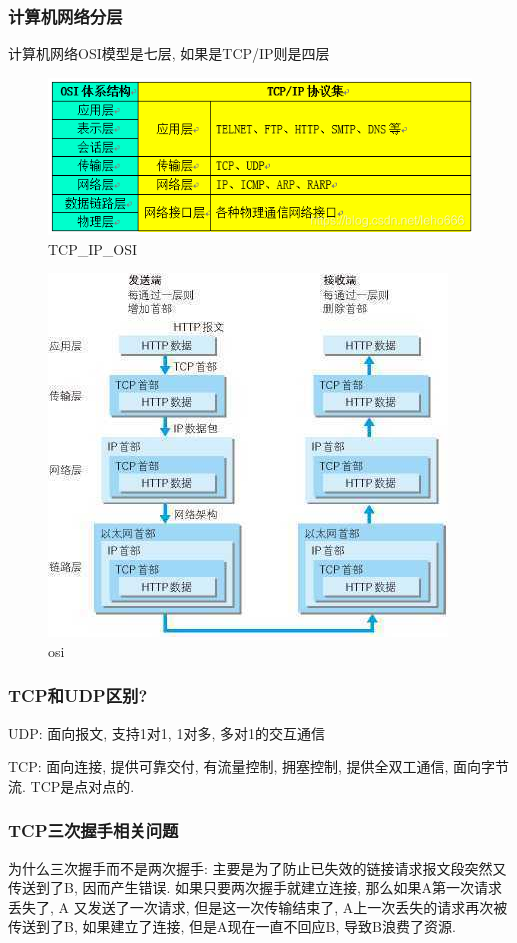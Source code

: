 \documentclass[UTF8]{ctexart}
\begin{document}
\subsubsection{计算机网络分层}
计算机网络OSI模型是七层, 如果是TCP/IP则是四层
\begin{figure}
	\centering
	\includegraphics[width=0.7\linewidth]{figures/TCP_IP_OSI.png}
	\caption{TCP\_IP\_OSI}
	\label{fig:TCP_IP_OSI}
\end{figure}
\begin{figure}
	\centering
	\includegraphics[width=0.7\linewidth]{figures/osi.jpg}
	\caption{osi}
	\label{fig:osi}
\end{figure}
\subsubsection{TCP和UDP区别?}
\par
UDP: 面向报文, 支持1对1, 1对多, 多对1的交互通信
\par
TCP: 面向连接, 提供可靠交付, 有流量控制, 拥塞控制, 提供全双工通信, 面向字节流. TCP是点对点的.
\subsubsection{TCP三次握手相关问题}
为什么三次握手而不是两次握手: 主要是为了防止已失效的链接请求报文段突然又传送到了B, 因而产生错误. 如果只要两次握手就建立连接, 那么如果A第一次请求丢失了, A 又发送了一次请求, 但是这一次传输结束了, A上一次丢失的请求再次被传送到了B, 如果建立了连接, 但是A现在一直不回应B, 导致B浪费了资源.
\end{document}
